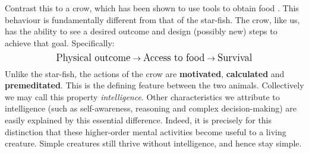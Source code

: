 \documentclass[10pt,a4paper]{article}
\begin{document}
				Contrast this to a crow, which has been shown to use tools to obtain
				food \cites{atlantic2017}. This behaviour is fundamentally different
				from that of the star-fish. The crow, like us, has the ability to see a
				desired outcome and design (possibly new) steps to achieve that goal.
				Specifically: \medskip \[ \text{\large Physical
				outcome}\rightarrow\text{\large Access to food}\rightarrow\text{\large
				Survival} \] Unlike the star-fish, the actions of the crow are
				\textbf{motivated}, \textbf{calculated} and \textbf{premeditated}. This
				is the defining feature between the two animals. Collectively we may
				call this property \textsl{intelligence}. Other characteristics we
				attribute to intelligence (such as self-awareness, reasoning and complex
				decision-making) are easily explained by this essential difference.
				Indeed, it is precisely for this distinction that these higher-order
				mental activities become useful to a living creature. Simple creatures
				still thrive without intelligence, and hence stay simple.
\end{document}
